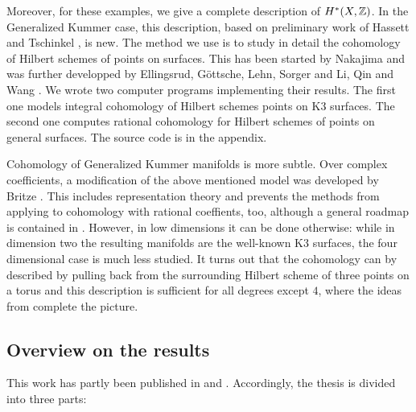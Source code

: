 Moreover, for these examples, we give a complete description of $H^*(X,\mathbb{Z})$. In the Generalized Kummer case, this description, based on preliminary work of Hassett and Tschinkel \cite{Hassett}, is new. 
The method we use is to study in detail the cohomology of Hilbert schemes of points on surfaces. This has been started by Nakajima \cite{Nakajima} and was further developped by Ellingsrud, G\"ottsche, Lehn, Sorger \cite{EGL,LehnSorger} and Li, Qin and Wang \cite{LiQinWang,LiQinWang2,QinWang}.
We wrote two computer programs implementing their results. The first one models integral cohomology of Hilbert schemes points on K3 surfaces. The second one computes rational cohomology for Hilbert schemes of points on general surfaces. The source code is in the appendix. 

Cohomology of Generalized Kummer manifolds is more subtle. Over complex coefficients, a modification of the above mentioned model was developed by Britze \cite{Britze}. This includes representation theory and prevents the methods from applying to cohomology with rational coeffients, too, although a general roadmap is contained in \cite{Twisted}.
However, in low dimensions it can be done otherwise: while in dimension two the resulting manifolds are the well-known K3 surfaces, the four dimensional case is much less studied. It turns out that the cohomology can by described by pulling back from the surrounding Hilbert scheme of three points on a torus and this description is sufficient for all degrees except $4$, where the ideas from \cite{Hassett} complete the picture.

\subsection{Overview on the results}
This work has partly been published in \cite{Kapfer2} and \cite{Kapfer}. Accordingly, the thesis is divided into three parts:

